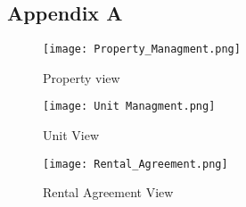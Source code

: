 \documentclass[11pt]{article}
\begin{document}
        \subsection{Appendix A}
            \begin{figure}
                \centering
                \texttt{[image: Property\_Managment.png]}
                \caption{Property view}
                \label{fig:enter-label}
            \end{figure}
            \begin{figure}
                \centering
                \texttt{[image: Unit Managment.png]}
                \caption{Unit View}
                \label{fig:enter-label}
            \end{figure}
            \begin{figure}
                \centering
                \texttt{[image: Rental\_Agreement.png]}
                \caption{Rental Agreement View}
                \label{fig:enter-label}
            \end{figure}
            
\end{document}
